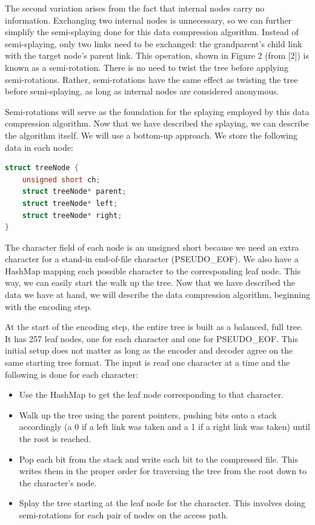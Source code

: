 \documentclass[twoside]{article}
\begin{document}
\begin{multicols}{2}
The second variation arises from the fact that internal nodes carry no information. Exchanging two internal nodes is unnecessary, so we can further simplify the semi-splaying done for this data compression algorithm. Instead of semi-splaying, only two links need to be exchanged: the grandparent's child link with the target node's parent link. This operation, shown in Figure 2 (from [2]) is known as a semi-rotation. There is no need to twist the tree before applying semi-rotations. Rather, semi-rotations have the same effect as twisting the tree before semi-splaying, as long as internal nodes are considered anonymous. 

Semi-rotations will serve as the foundation for the splaying employed by this data compression algorithm. Now that we have described the splaying, we can describe the algorithm itself. We will use a bottom-up approach. We store the following data in each node:

\begin{lstlisting}[language=C++]
struct treeNode {
    unsigned short ch;
    struct treeNode* parent;
    struct treeNode* left;
    struct treeNode* right;
}
\end{lstlisting}

The character field of each node is an unsigned short because we need an extra character for a stand-in end-of-file character (PSEUDO\_EOF). We also have a HashMap mapping each possible character to the corresponding leaf node. This way, we can easily start the walk up the tree. Now that we have described the data we have at hand, we will describe the data compression algorithm, beginning with the encoding step.  

At the start of the encoding step, the entire tree is built as a balanced, full tree. It has 257 leaf nodes, one for each character and one for PSEUDO\_EOF. This initial setup does not matter as long as the encoder and decoder agree on the same starting tree format. The input is read one character at a time and the following is done for each character:
\begin{itemize}
\item Use the HashMap to get the leaf node corresponding to that character.
\item Walk up the tree using the parent pointers, pushing bits onto a stack accordingly (a 0 if a left link was taken and a 1 if a right link was taken) until the root is reached.
\item Pop each bit from the stack and write each bit to the compressed file. This writes them in the proper order for traversing the tree from the root down to the character's node.
\item Splay the tree starting at the leaf node for the character. This involves doing semi-rotations for each pair of nodes on the access path.
\end{itemize}


\end{multicols}
\end{document}
